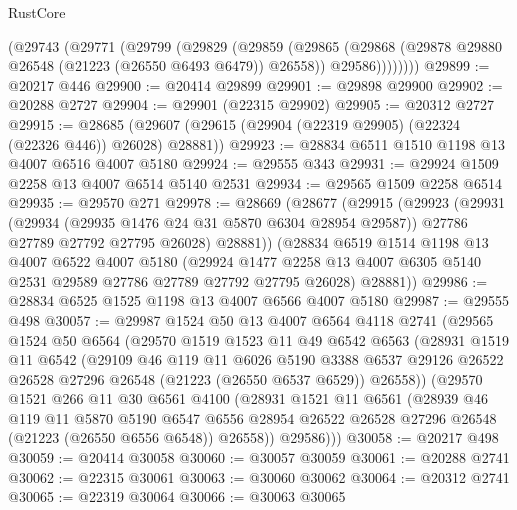 \begin{lexlean}{RustCore}
\begin{coremodule}
        (@29743
          (@29771
            (@29799
              (@29829
                (@29859
                  (@29865
                    (@29868 (@29878 @29880 @26548 (@21223 (@26550 @6493 @6479)) @26558))
                    @29586))))))))
@29899 := @20217 @446
@29900 := @20414 @29899
@29901 := @29898 @29900
@29902 := @20288 @2727
@29904 := @29901 (@22315 @29902)
@29905 := @20312 @2727
@29915 := @28685 (@29607 (@29615 (@29904 (@22319 @29905) (@22324 (@22326 @446)) @26028) @28881))
@29923 := @28834 @6511 @1510 @1198 @13 @4007 @6516 @4007 @5180
@29924 := @29555 @343
@29931 := @29924 @1509 @2258 @13 @4007 @6514 @5140 @2531
@29934 := @29565 @1509 @2258 @6514
@29935 := @29570 @271
@29978 := @28669
    (@28677
      (@29915
        (@29923
          (@29931
            (@29934 (@29935 @1476 @24 @31 @5870 @6304 @28954 @29587))
            @27786
            @27789
            @27792
            @27795
            @26028)
          @28881))
      (@28834
        @6519
        @1514
        @1198
        @13
        @4007
        @6522
        @4007
        @5180
        (@29924 @1477 @2258 @13 @4007 @6305 @5140 @2531 @29589 @27786 @27789 @27792 @27795 @26028)
        @28881))
@29986 := @28834 @6525 @1525 @1198 @13 @4007 @6566 @4007 @5180
@29987 := @29555 @498
@30057 := @29987
    @1524
    @50
    @13
    @4007
    @6564
    @4118
    @2741
    (@29565
      @1524
      @50
      @6564
      (@29570
        @1519
        @1523
        @11
        @49
        @6542
        @6563
        (@28931
          @1519
          @11
          @6542
          (@29109
            @46
            @119
            @11
            @6026
            @5190
            @3388
            @6537
            @29126
            @26522
            @26528
            @27296
            @26548
            (@21223 (@26550 @6537 @6529))
            @26558))
        (@29570
          @1521
          @266
          @11
          @30
          @6561
          @4100
          (@28931
            @1521
            @11
            @6561
            (@28939
              @46
              @119
              @11
              @5870
              @5190
              @6547
              @6556
              @28954
              @26522
              @26528
              @27296
              @26548
              (@21223 (@26550 @6556 @6548))
              @26558))
          @29586)))
@30058 := @20217 @498
@30059 := @20414 @30058
@30060 := @30057 @30059
@30061 := @20288 @2741
@30062 := @22315 @30061
@30063 := @30060 @30062
@30064 := @20312 @2741
@30065 := @22319 @30064
@30066 := @30063 @30065

\end{coremodule}
\end{lexlean}

